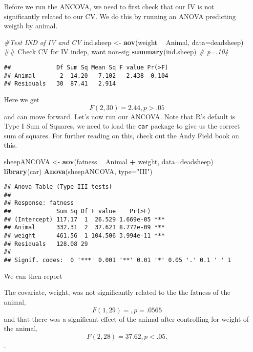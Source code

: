 \documentclass[]{book}
\newenvironment{Shaded}{\begin{snugshade}}{\end{snugshade}}
\newcommand{\KeywordTok}[1]{\textcolor[rgb]{0.13,0.29,0.53}{\textbf{#1}}}
\newcommand{\DataTypeTok}[1]{\textcolor[rgb]{0.13,0.29,0.53}{#1}}
\newcommand{\StringTok}[1]{\textcolor[rgb]{0.31,0.60,0.02}{#1}}
\newcommand{\CommentTok}[1]{\textcolor[rgb]{0.56,0.35,0.01}{\textit{#1}}}
\newcommand{\OperatorTok}[1]{\textcolor[rgb]{0.81,0.36,0.00}{\textbf{#1}}}
\newcommand{\NormalTok}[1]{#1}
\theoremstyle{definition}
\theoremstyle{definition}
\theoremstyle{definition}
\theoremstyle{remark}
\begin{document}
Before we run the ANCOVA, we need to first check that our IV is not
significantly related to our CV. We do this by running an ANOVA
predicting weigth by animal.

\begin{Shaded}
\begin{Highlighting}[]
\CommentTok{#Test IND of IV and CV}
\NormalTok{ind.sheep <-}\StringTok{ }\KeywordTok{aov}\NormalTok{(weight }\OperatorTok{~}\StringTok{ }\NormalTok{Animal, }\DataTypeTok{data=}\NormalTok{deadsheep) ## Check CV for IV indep, want non-sig}
\KeywordTok{summary}\NormalTok{(ind.sheep) }\CommentTok{# p=.104}
\end{Highlighting}
\end{Shaded}

\begin{verbatim}
##             Df Sum Sq Mean Sq F value Pr(>F)
## Animal       2  14.20   7.102   2.438  0.104
## Residuals   30  87.41   2.914
\end{verbatim}

Here we get\[ F(2,30) = 2.44, p> .05\] and can move forward. Let's now
run our ANCOVA. Note that R's default is Type I Sum of Squares, we need
to load the \texttt{car} package to give us the correct sum of squares.
For further reading on this, check out the Andy Field book on this.

\begin{Shaded}
\begin{Highlighting}[]
\NormalTok{sheepANCOVA <-}\StringTok{ }\KeywordTok{aov}\NormalTok{(fatness }\OperatorTok{~}\StringTok{ }\NormalTok{Animal }\OperatorTok{+}\StringTok{ }\NormalTok{weight, }\DataTypeTok{data=}\NormalTok{deadsheep)}
\KeywordTok{library}\NormalTok{(car)}
\KeywordTok{Anova}\NormalTok{(sheepANCOVA, }\DataTypeTok{type=}\StringTok{"III"}\NormalTok{)}
\end{Highlighting}
\end{Shaded}

\begin{verbatim}
## Anova Table (Type III tests)
## 
## Response: fatness
##             Sum Sq Df F value    Pr(>F)    
## (Intercept) 117.17  1  26.529 1.669e-05 ***
## Animal      332.31  2  37.621 8.772e-09 ***
## weight      461.56  1 104.506 3.994e-11 ***
## Residuals   128.08 29                      
## ---
## Signif. codes:  0 '***' 0.001 '**' 0.01 '*' 0.05 '.' 0.1 ' ' 1
\end{verbatim}

We can then report

The covariate, weight, was not significantly related to the the fatness
of the animal, \[F(1, 29) =,p=.0565 \] and that there was a significant
effect of the animal after controlling for weight of the animal,
\[F(2,28) = 37.62, p < .05.\].
\end{document}
